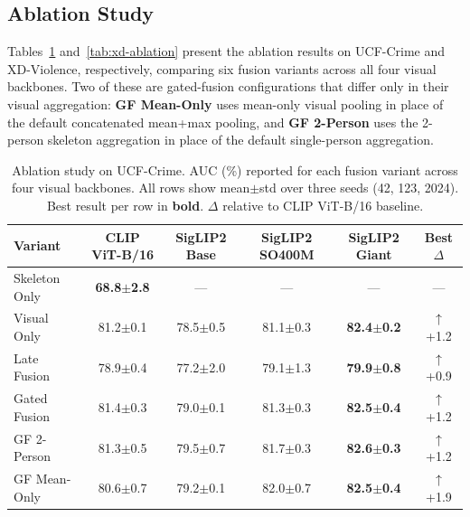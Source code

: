 \documentclass[sigconf]{acmart}
\begin{document}
\subsection{Ablation Study}

Tables~\ref{tab:ucf-ablation} and~\ref{tab:xd-ablation} present the ablation results on UCF-Crime and XD-Violence, respectively, comparing six fusion variants across all four visual backbones. Two of these are gated-fusion configurations that differ only in their visual aggregation: \textbf{GF Mean-Only} uses mean-only visual pooling in place of the default concatenated mean+max pooling, and \textbf{GF 2-Person} uses the 2-person skeleton aggregation in place of the default single-person aggregation.

\begin{table}[t]
\caption{Ablation study on UCF-Crime. AUC (\%) reported for each fusion variant across four visual backbones. All rows show mean$\pm$std over three seeds (42, 123, 2024). Best result per row in \textbf{bold}. $\Delta$ relative to CLIP ViT-B/16 baseline.}
\label{tab:ucf-ablation}
\begin{tabular}{l c c c c c}
\toprule
Variant & CLIP ViT-B/16 & SigLIP2 Base & SigLIP2 SO400M & SigLIP2 Giant & Best $\Delta$ \\
\midrule
Skeleton Only & \textbf{68.8$\pm$2.8} & --- & --- & --- & --- \\
Visual Only & 81.2$\pm$0.1 & 78.5$\pm$0.5 & 81.1$\pm$0.3 & \textbf{82.4$\pm$0.2} & $\uparrow$+1.2 \\
\midrule
Late Fusion & 78.9$\pm$0.4 & 77.2$\pm$2.0 & 79.1$\pm$1.3 & \textbf{79.9$\pm$0.8} & $\uparrow$+0.9 \\
Gated Fusion & 81.4$\pm$0.3 & 79.0$\pm$0.1 & 81.3$\pm$0.3 & \textbf{82.5$\pm$0.4} & $\uparrow$+1.2 \\
GF 2-Person & 81.3$\pm$0.5 & 79.5$\pm$0.7 & 81.7$\pm$0.3 & \textbf{82.6$\pm$0.3} & $\uparrow$+1.2 \\
GF Mean-Only & 80.6$\pm$0.7 & 79.2$\pm$0.1 & 82.0$\pm$0.7 & \textbf{82.5$\pm$0.4} & $\uparrow$+1.9 \\
\bottomrule
\end{tabular}
\end{table}
\end{document}
